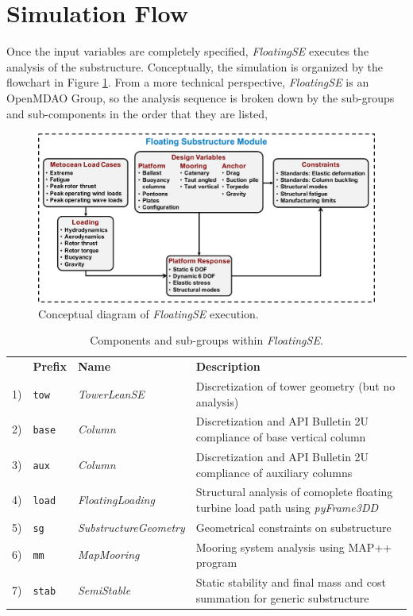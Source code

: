 \section{Simulation Flow}
Once the input variables are completely specified, \textit{FloatingSE}
executes the analysis of the substructure.  Conceptually, the simulation
is organized by the flowchart in Figure \ref{fig:floatingse}.  From a
more technical perspective, \textit{FloatingSE} is
an OpenMDAO Group, so the analysis sequence is broken down by the
sub-groups and sub-components in the order that they are listed,

\begin{figure}
  \begin{center}
    \includegraphics[width=5in]{figs/floatingse.pdf}
    \caption{Conceptual diagram of \textit{FloatingSE} execution.}
    \label{fig:floatingse}
  \end{center}
\end{figure}

\begin{table}[htbp] \begin{center}
    \caption{Components and sub-groups within \textit{FloatingSE}.}
    \label{tbl:exec}
{\small
  \begin{tabular}{ l l l l } \hline
    &  \textbf{Prefix} & \textbf{Name} & \textbf{Description} \\
    1) & \texttt{tow} & \textit{TowerLeanSE} & Discretization of tower
    geometry (but no analysis) \\
    2) & \texttt{base} & \textit{Column} & Discretization and API
    Bulletin 2U compliance of base vertical column \\
    3) & \texttt{aux} & \textit{Column} & Discretization and API
    Bulletin 2U compliance of auxiliary columns \\
    4) & \texttt{load} & \textit{FloatingLoading} & Structural analysis
    of comoplete floating turbine load path using \textit{pyFrame3DD} \\
    5) & \texttt{sg} & \textit{SubstructureGeometry} & Geometrical constraints
    on substructure \\
    6) & \texttt{mm} & \textit{MapMooring} & Mooring system analysis using MAP++ program \\
    7) & \texttt{stab} & \textit{SemiStable} & Static stability and final mass and cost summation for generic substructure \\
  \hline \end{tabular}
}
\end{center} \end{table}

